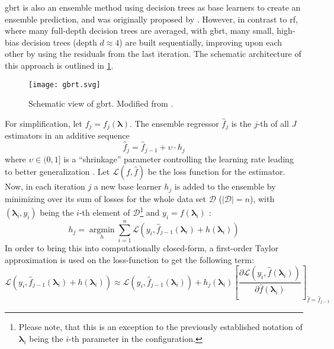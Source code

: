 \gls{gbrt} is also an ensemble method using decision trees as base learners to create an ensemble prediction, and was originally proposed by \citet{friedman2001greedy}. However, in contrast to \gls{rf}, where many full-depth decision trees are averaged, with \gls{gbrt}, many small, high-bias decision trees (depth $d \approx 4$) are built sequentially, improving upon each other by using the residuals from the last iteration. The schematic architecture of this approach is outlined in \cref{fig:gbrt}.
\begin{figure}
	\centering
	\texttt{[image: gbrt.svg]}
	\caption[Schematic view of \gls{gbrt}]{Schematic view of \gls{gbrt}. Modified from \citet{deng2021ensemble}.}
	\label{fig:gbrt}
\end{figure}
For simplification, let $f_j = f_j(\mathbf{\lambda})$. The ensemble regressor $\hat{f}_j$ is the $j$-th of all $J$ estimators in an additive sequence 
\begin{equation}
	\label{eq:add-gbrt}
	\hat{f}_j = \hat{f}_{j-1} + \upsilon \cdot h_j
\end{equation}
where $\upsilon \in (0,1]$ is a \enquote{shrinkage} parameter controlling the learning rate leading to better generalization \cite{friedman2002stochastic}.
Let $\mathcal{L}(f,\hat{f})$ be the loss function for the estimator. Now, in each iteration $j$ a new base learner $h_j$ is added to the ensemble by minimizing over its sum of losses for the whole data set $\mathcal{D}$ ($|\mathcal{D}| = n$), with $(\mathbf{\lambda}_i, y_i)$ being the $i$-th element of $\mathcal{D}$\footnote{Please note, that this is an exception to the previously established notation of $\mathbf{\lambda}_i$ being the $i$-th parameter in the configuration.} and $y_i = f(\mathbf{\lambda}_i)$ \cite{friedman2001greedy}:
\begin{equation}
	\label{eq:gbrt-tree}
	h_j = \operatorname*{argmin}_{h} \sum_{i=1}^{n} \mathcal{L}(y_i, \hat{f}_{j-1}(\mathbf{\lambda}_i) + h(\mathbf{\lambda}_i))
\end{equation}
In order to bring this into computationally closed-form, a first-order Taylor approximation is used on the loss-function to get the following term:
\begin{equation}
	\mathcal{L}(y_i, \hat{f}_{j-1}(\mathbf{\lambda}_i) + h(\mathbf{\lambda}_i)) \approx \mathcal{L}(y_i, \hat{f}_{j-1}(\mathbf{\lambda}_i)) + h_j(\mathbf{\lambda}_i) \left[ \frac{\partial\mathcal{L}(y_i, \hat{f}(\mathbf{\lambda}_i))}{\partial \hat{f}(\mathbf{\lambda}_i)} \right]_{\hat{f}=\hat{f}_{j-1}}
\end{equation}
